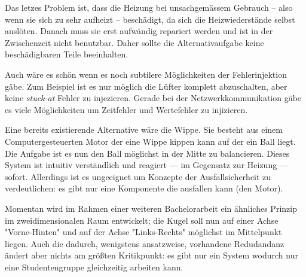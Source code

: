 Das letzes Problem ist, dass die Heizung bei unsachgem{\"{a}}ssem Gebrauch -- also wenn sie sich zu sehr aufheizt --
besch{\"{a}}digt, da sich die Heizwiederst{\"{a}}nde selbst ausl{\"{o}}ten. Danach muss sie erst aufw{\"{a}}ndig
repariert werden und ist in der Zwischenzeit nicht benutzbar. Daher sollte die Alternativaufgabe keine besch{\"{a}}digbaren
Teile beeinhalten.

Auch w{\"{a}}re es sch{\"{o}}n wenn es noch subtilere M{\"{o}}glichkeiten der Fehlerinjektion g{\"{a}}be. Zum Beispiel ist
es nur m{\"{o}}glich die L{\"{u}}fter komplett abzuschalten, aber keine \textit{stuck-at} Fehler zu injezieren.
Gerade bei der Netzwerkkommunikation g{\"{a}}be es viele M{\"{o}}glichkeiten um Zeitfehler und Wertefehler zu injizieren.

Eine bereits existierende Alternative w{\"{a}}re die Wippe. Sie besteht aus einem Computergesteuerten Motor der eine
Wippe kippen kann auf der ein Ball liegt. Die Aufgabe ist es nun den Ball m{\"{o}}glichst in der Mitte zu balancieren.
Dieses System ist intuitiv verst{\"{a}}ndlich und reagiert --- im Gegensatz zur Heizung --- sofort. Allerdings ist
es ungeeignet um Konzepte der Ausfallsicherheit zu verdeutlichen: es gibt nur eine Komponente die ausfallen kann (den
Motor).

Momentan wird im Rahmen einer weiteren Bachelorarbeit ein {\"{a}}hnliches Prinzip im zweidimensionalen Raum entwickelt;
die Kugel soll nun auf einer Achse "Vorne-Hinten" und auf der Achse "Links-Rechts" m{\"{o}}glichst im Mittelpunkt liegen.
Auch die dadurch, wenigstens ansatzweise, vorhandene Redudandanz {\"{a}}ndert aber nichts am gr{\"{o}}{\ss}ten Kritikpunkt:
es gibt nur ein System wodurch nur eine Studentengruppe gleichzeitig arbeiten kann.

\clearpage
